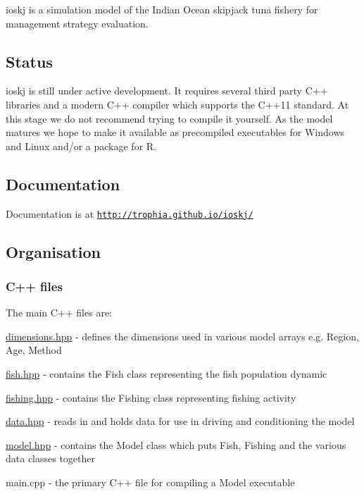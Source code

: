 {\ttfamily ioskj} is a simulation model of the Indian Ocean skipjack tuna fishery for management strategy evaluation.

\subsection*{Status}

{\ttfamily ioskj} is still under active development. It requires several third party C++ libraries and a modern C++ compiler which supports the C++11 standard. At this stage we do not recommend trying to compile it yourself. As the model matures we hope to make it available as precompiled executables for Windows and Linux and/or a package for R.

\subsection*{Documentation}

Documentation is at \href{http://trophia.github.io/ioskj/}{\tt http\-://trophia.\-github.\-io/ioskj/}

\subsection*{Organisation}

\subsubsection*{C++ files}

The main C++ files are\-:


\begin{DoxyItemize}
\item {\ttfamily \hyperlink{dimensions_8hpp_source}{dimensions.\-hpp}} -\/ defines the dimensions used in various model arrays e.\-g. {\ttfamily Region}, {\ttfamily Age}, {\ttfamily Method}
\item {\ttfamily \hyperlink{fish_8hpp_source}{fish.\-hpp}} -\/ contains the {\ttfamily Fish} class representing the fish population dynamic
\item {\ttfamily \hyperlink{fishing_8hpp_source}{fishing.\-hpp}} -\/ contains the {\ttfamily Fishing} class representing fishing activity
\item {\ttfamily \hyperlink{data_8hpp_source}{data.\-hpp}} -\/ reads in and holds data for use in driving and conditioning the model
\item {\ttfamily \hyperlink{model_8hpp_source}{model.\-hpp}} -\/ contains the {\ttfamily Model} class which puts {\ttfamily Fish}, {\ttfamily Fishing} and the various data classes together
\item {\ttfamily main.\-cpp} -\/ the primary C++ file for compiling a {\ttfamily Model} executable
\end{DoxyItemize}

